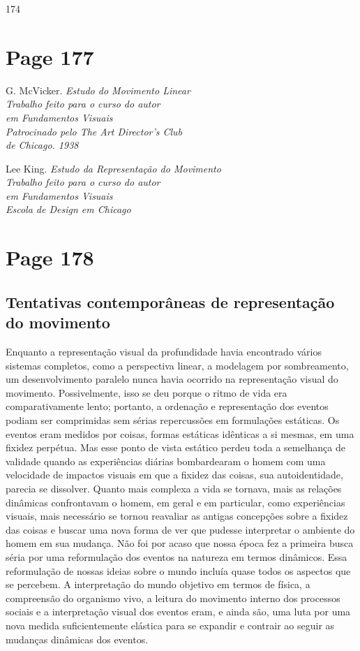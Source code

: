 \documentclass[a4paper]{article}
\begin{document}
\vspace{\fill}
174

\newpage
\section*{Page 177}

G. McVicker. \textit{Estudo do Movimento Linear}\\
\textit{Trabalho feito para o curso do autor}\\
\textit{em Fundamentos Visuais}\\
\textit{Patrocinado pelo The Art Director's Club}\\
\textit{de Chicago. 1938}

Lee King. \textit{Estudo da Representação do Movimento}\\
\textit{Trabalho feito para o curso do autor}\\
\textit{em Fundamentos Visuais}\\
\textit{Escola de Design em Chicago}

\newpage
\section*{Page 178}

\subsection*{Tentativas contemporâneas de representação do movimento}

Enquanto a representação visual da profundidade havia encontrado vários sistemas completos, como a perspectiva linear, a modelagem por sombreamento, um desenvolvimento paralelo nunca havia ocorrido na representação visual do movimento. Possivelmente, isso se deu porque o ritmo de vida era comparativamente lento; portanto, a ordenação e representação dos eventos podiam ser comprimidas sem sérias repercussões em formulações estáticas. Os eventos eram medidos por coisas, formas estáticas idênticas a si mesmas, em uma fixidez perpétua. Mas esse ponto de vista estático perdeu toda a semelhança de validade quando as experiências diárias bombardearam o homem com uma velocidade de impactos visuais em que a fixidez das coisas, sua autoidentidade, parecia se dissolver. Quanto mais complexa a vida se tornava, mais as relações dinâmicas confrontavam o homem, em geral e em particular, como experiências visuais, mais necessário se tornou reavaliar as antigas concepções sobre a fixidez das coisas e buscar uma nova forma de ver que pudesse interpretar o ambiente do homem em sua mudança. Não foi por acaso que nossa época fez a primeira busca séria por uma reformulação dos eventos na natureza em termos dinâmicos. Essa reformulação de nossas ideias sobre o mundo incluía quase todos os aspectos que se percebem. A interpretação do mundo objetivo em termos de física, a compreensão do organismo vivo, a leitura do movimento interno dos processos sociais e a interpretação visual dos eventos eram, e ainda são, uma luta por uma nova medida suficientemente elástica para se expandir e contrair ao seguir as mudanças dinâmicas dos eventos.
\end{document}
